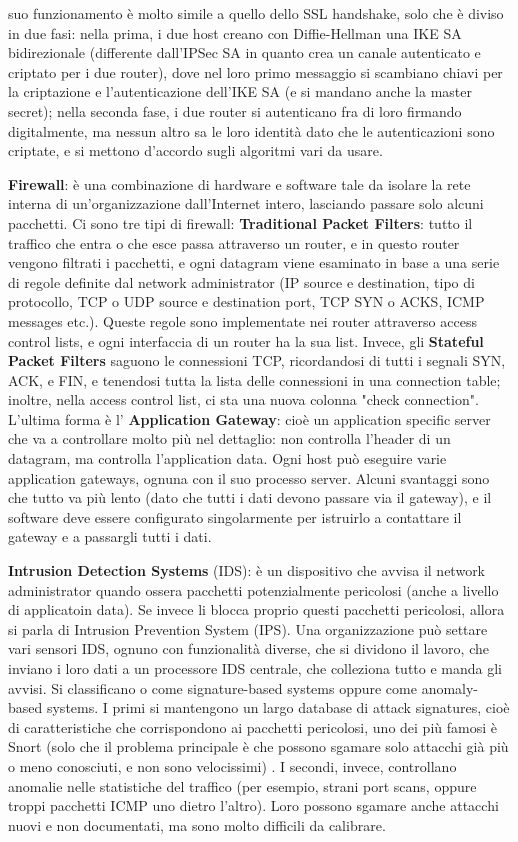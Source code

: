 \documentclass[a4paper,10pt]{article} %
\renewcommand{\b}[1]{%
    {\textbf{#1}}}
\begin{document}
suo funzionamento è molto simile a quello dello SSL handshake, solo che è diviso in due fasi: nella prima, i due host creano con Diffie-Hellman una IKE SA bidirezionale (differente dall'IPSec SA in quanto crea un canale autenticato e criptato per i due router), dove nel loro primo messaggio si scambiano chiavi per la criptazione e l'autenticazione dell'IKE SA (e si mandano anche la master secret); nella seconda fase, i due router si autenticano fra di loro firmando digitalmente, ma nessun altro sa le loro identità dato che le autenticazioni sono criptate, e si mettono d'accordo sugli algoritmi vari da usare.

\b{Firewall}: è una combinazione di hardware e software tale da isolare la rete interna di un'organizzazione dall'Internet intero, lasciando passare solo alcuni pacchetti. Ci sono tre tipi di firewall:  \b{Traditional Packet Filters}: tutto il traffico che entra o che esce passa attraverso un router, e in questo router vengono filtrati i pacchetti, e ogni datagram viene esaminato in base a una serie di regole definite dal network administrator (IP source e destination, tipo di protocollo, TCP o UDP source e destination port, TCP SYN o ACKS, ICMP messages etc.). Queste regole sono implementate nei router attraverso access control lists, e ogni interfaccia di un router ha la sua list. Invece, gli \b{Stateful Packet Filters} saguono le connessioni TCP, ricordandosi di tutti i segnali SYN, ACK, e FIN, e tenendosi tutta la lista delle connessioni in una connection table; inoltre, nella access control list, ci sta una nuova colonna "check connection". L'ultima forma è l'\b{Application Gateway}: cioè un application specific server che va a controllare molto più nel dettaglio: non controlla l'header di un datagram, ma controlla l'application data. Ogni host può eseguire varie application gateways, ognuna con il suo processo server. Alcuni svantaggi sono che tutto va più lento (dato che tutti i dati devono passare via il gateway), e il software deve essere configurato singolarmente per istruirlo a contattare il gateway e a passargli tutti i dati.

\b{Intrusion Detection Systems} (IDS): è un dispositivo che avvisa il network administrator quando ossera pacchetti potenzialmente pericolosi (anche a livello di applicatoin data). Se invece li blocca proprio questi pacchetti pericolosi, allora si parla di Intrusion Prevention System (IPS). Una organizzazione può settare vari sensori IDS, ognuno con funzionalità diverse, che si dividono il lavoro, che inviano i loro dati a un processore IDS centrale, che colleziona tutto e manda gli avvisi. Si classificano o come signature-based systems oppure come anomaly-based systems. I primi  si mantengono un largo database di attack signatures, cioè di caratteristiche che corrispondono ai pacchetti pericolosi, uno dei più famosi è Snort (solo che il problema principale è che possono sgamare solo attacchi già più o meno conosciuti, e non sono velocissimi) . I secondi, invece, controllano anomalie nelle statistiche del traffico (per esempio, strani port scans, oppure troppi pacchetti ICMP uno dietro l'altro). Loro possono sgamare anche attacchi nuovi e non documentati, ma sono molto difficili da calibrare.
\end{document}
